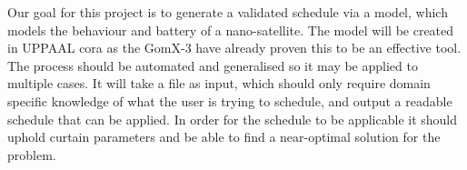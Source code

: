 Our goal for this project is to generate a validated schedule via a  model, which models the behaviour and battery of a nano-satellite. The model will be created in UPPAAL \gls{cora} as the GomX-3\cite{gomx3} have already proven this to be an effective tool. The process should be automated and generalised so it may be applied to multiple cases. It will take a file as input, which should only require domain specific knowledge of what the user is trying to schedule, and output a readable schedule that can be applied. In order for the schedule to be applicable it should uphold curtain parameters and be able to find a near-optimal solution for the problem.







